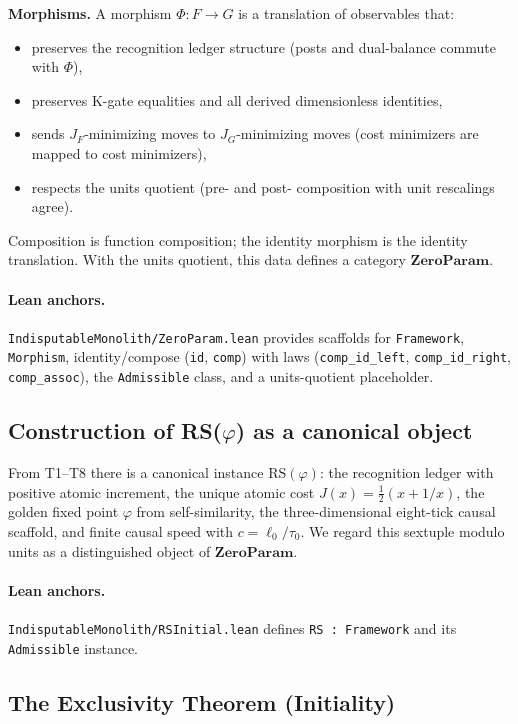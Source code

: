 \documentclass[11pt]{article}
\begin{document}
\textbf{Morphisms.} A morphism \(\Phi\colon F\to G\) is a translation of observables that:
\begin{itemize}
  \item preserves the recognition ledger structure (posts and dual\mbox{-}balance commute with \(\Phi\)),
  \item preserves K\mbox{-}gate equalities and all derived dimensionless identities,
  \item sends \(J_F\)\mbox{-}minimizing moves to \(J_G\)\mbox{-}minimizing moves (cost minimizers are mapped to cost minimizers),
  \item respects the units quotient (pre\mbox{-} and post\mbox{-} composition with unit rescalings agree).
\end{itemize}
Composition is function composition; the identity morphism is the identity translation. With the units quotient, this data defines a category \(\mathbf{ZeroParam}\).

\paragraph{Lean anchors.} \texttt{IndisputableMonolith/ZeroParam.lean} provides scaffolds for \texttt{Framework}, \texttt{Morphism}, identity/compose (\texttt{id}, \texttt{comp}) with laws (\texttt{comp\_id\_left}, \texttt{comp\_id\_right}, \texttt{comp\_assoc}), the \texttt{Admissible} class, and a units\mbox{-}quotient placeholder.

\subsection{Construction of RS(\(\varphi\)) as a canonical object}
From T1--T8 there is a canonical instance \(\mathrm{RS}(\varphi)\): the recognition ledger with positive atomic increment, the unique atomic cost \(J(x)=\tfrac{1}{2}(x+1/x)\), the golden fixed point \(\varphi\) from self\mbox{-}similarity, the three\mbox{-}dimensional eight\mbox{-}tick causal scaffold, and finite causal speed with \(c=\ell_0/\tau_0\). We regard this sextuple modulo units as a distinguished object of \(\mathbf{ZeroParam}\).

\paragraph{Lean anchors.} \texttt{IndisputableMonolith/RSInitial.lean} defines \texttt{RS : Framework} and its \texttt{Admissible} instance.

\subsection{The Exclusivity Theorem (Initiality)}
\end{document}
